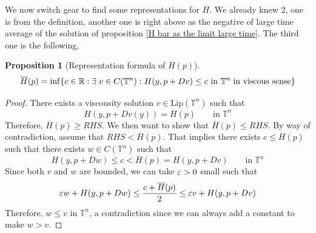 \documentclass[12pt, oneside]{amsart}  	%
\newtheorem{proposition}{Proposition}
\begin{document}
We now switch gear to find some representations for $\overline{H}$. We already knew 2, one is from the definition, another one is right above as the negative of large time average of the solution of proposition \ref{H bar as the limit large time}. The third one is the following,
\begin{proposition}[Representation formula of $\overline{H}(p)$]
\begin{equation*}
\overline{H}(p)=\inf\{ c \in \mathbb{R}: \exists\;v\in C(\mathbb{T}^n): H(y, p+Dv)\le c \text{ in }\mathbb{T}^n\;\text{in viscous sense}\}
\end{equation*}
\end{proposition}
\begin{proof} There exists a viscousity solution $v\in \text{Lip}(\mathbb{T}^n)$ 
such that
\begin{equation*}
H(y, p + Dv(y))=\overline{H}(p) \qquad\text{in}\; \mathbb{T}^n
\end{equation*}
Therefore, $\overline{H}(p)\ge RHS$. We then want to show that $\overline{H}(p)\le RHS$. By way of contradiction, assume that $RHS<\overline{H}(p)$. That implies there exists $c\le \overline{H}(p)$ such that there exists $w\in C(\mathbb{T}^n)$ such that
\begin{equation*}
H(y, p+ Dw)\le c < \overline{H}(p)=H(y, p+ Dv) \qquad\text{in}\; \mathbb{T}^n
\end{equation*}
Since both $v$ and $w$ are bounded, we can take $\varepsilon>0$ small such that
\begin{equation*}
\varepsilon w + H(y, p+ Dw)\le \frac{c+\overline{H}(p)}{2} \le \varepsilon v + H(y, p+ Dv)
\end{equation*}
Therefore, $w\le v$ in $\mathbb{T}^n$, a contradiction since we can always add a constant to make $w>v$.
\end{proof}
\end{document}
